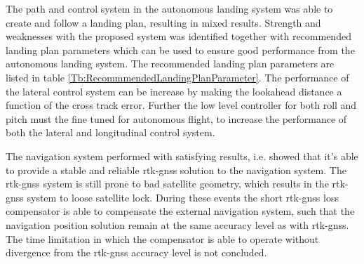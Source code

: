 The path and control system in the autonomous landing system was able to create and follow a landing plan, resulting in mixed results. Strength and weaknesses with the proposed system was identified together with recommended landing plan parameters which can be used to ensure good performance from the autonomous landing system. The recommended landing plan parameters are listed in table \ref{Tb:RecommmendedLandingPlanParameter}. The performance of the lateral control system can be increase by making the lookahead distance a function of the cross track error. Further the low level controller for both roll and pitch must the fine tuned for autonomous flight, to increase the performance of both the lateral and longitudinal control system.

The navigation system performed with satisfying results, i.e. showed that it's able to provide a stable and reliable \gls{rtk-gnss} solution to the navigation system. The \gls{rtk-gnss} system is still prone to bad satellite geometry, which results in the \gls{rtk-gnss} system to loose satellite lock. During these events the short \gls{rtk-gnss} loss compensator is able to compensate the external navigation system, such that the navigation position solution remain at the same accuracy level as with \gls{rtk-gnss}. The time limitation in which the compensator is able to operate without divergence from the \gls{rtk-gnss} accuracy level is not concluded.